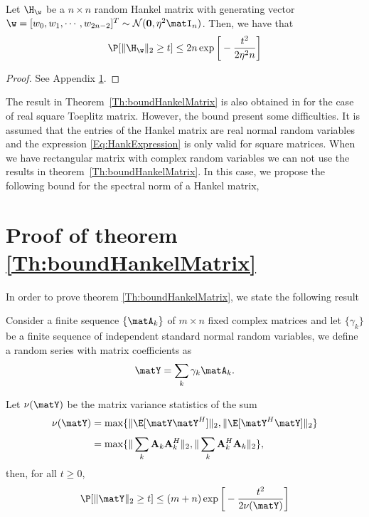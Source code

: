 \begin{theorem}\label{Th:boundHankelMatrix}
	Let $\H_{\w}$ be a $n\times n$ random Hankel matrix with generating vector $\w = [w_0, w_1,\cdots,w_{2n-2}]^T\sim\mathcal{N}(\mathbf{0},\eta^2\matI_n)$. Then, we have that
	\begin{equation}
		\P[\|\H_{\w}\|_2\geq t] \leq 2n \exp\bigg[-\frac{t^2}{2\eta^2n}\bigg]
		\label{Eq:BoundHankelMatrix}
	\end{equation}
\end{theorem}				
\begin{proof}
	See Appendix \ref{Proof:BoundHankelMatrix}.
\end{proof}

The result in Theorem~\ref{Th:boundHankelMatrix} is also obtained in \cite{Qiao2020} for the case of real square Toeplitz matrix. However, the bound present some difficulties. It is assumed that the entries of the Hankel matrix are real normal random variables and the expression \eqref{Eq:HankExpression} is only valid for square matrices. When we have rectangular matrix with complex random variables we can not use the results in theorem~\ref{Th:boundHankelMatrix}. In this case, we propose the following bound for the spectral norm of a Hankel matrix,

\section{Proof of theorem \ref{Th:boundHankelMatrix}} \label{Proof:BoundHankelMatrix}

In order to prove theorem \ref{Th:boundHankelMatrix}, we state the following result

\begin{lemma}\cite[Chap. 4]{tropp2015}\label{lemma:RandomMatrixIneq}
	
	Consider a finite sequence $\{\matA_k\}$ of $m\times n$ fixed complex matrices and let $\{\gamma_k\}$ be a finite sequence of independent standard normal random variables, we define a random series with matrix coefficients as									
	\begin{equation}
		\matY = \sum_k\gamma_k\matA_k.
		\label{Eq:GaussSeries}
	\end{equation}
	
	Let $\nu(\matY)$ be the matrix variance statistics of the sum
	\begin{equation}
		\begin{aligned} 
			\nu(\matY) & = \max\{\|\E[\matY\matY^H]\|_2,\|\E[\matY^H\matY]\|_2\}\\[0.3em]
			& = \max\{\|\sum_k\mathbf{A}_k\mathbf{A}_k^H\|_2,\|\sum_k\mathbf{A}_k^H\mathbf{A}_k\|_2\},
		\end{aligned}
	\end{equation}
	then, for all $t\geq 0$,
	\begin{equation}
		\P[\|\matY\|_2\geq t]\leq (m+n)\exp\bigg[-\frac{t^2}{2\nu(\matY)}\bigg]
		\label{Eq:boundGaussSeries}
	\end{equation}						
\end{lemma}

